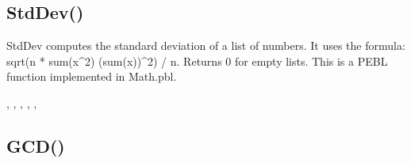 \documentclass[letterpaper,10pt,english]{sphinxmanual}
\begin{document}
\subsection{StdDev()}
\label{\detokenize{reference/math:stddev}}\label{\detokenize{reference/math:index-18}}
\sphinxAtStartPar
{}

\sphinxAtStartPar
{}

\sphinxAtStartPar
StdDev computes the standard deviation of a list of numbers. It uses the formula: sqrt(n * sum(x\textasciicircum{}2) \sphinxhyphen{} (sum(x))\textasciicircum{}2) / n. Returns 0 for empty lists. This is a PEBL function implemented in Math.pbl.

\sphinxAtStartPar
{}

\begin{sphinxVerbatim}[commandchars=\\\{\}]
\end{sphinxVerbatim}

\sphinxAtStartPar
{}

\begin{sphinxVerbatim}[commandchars=\\\{\}]
\PYG{p}{[}\PYG{p}{]}
\end{sphinxVerbatim}

\sphinxAtStartPar
{}

\sphinxAtStartPar
{}, , , , , 

\ignorespaces 

\subsection{GCD()}
\label{\detokenize{reference/math:gcd}}\label{\detokenize{reference/math:index-19}}
\sphinxAtStartPar
{}
\end{document}
